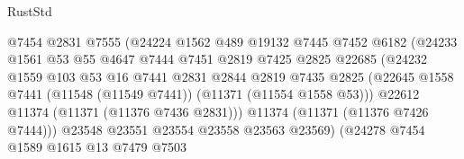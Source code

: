 \begin{lexlean}{RustStd}
\begin{coremodule}
                                    @7454
                                    @2831
                                    @7555
                                    (@24224
                                      @1562
                                      @489
                                      @19132
                                      @7445
                                      @7452
                                      @6182
                                      (@24233
                                        @1561
                                        @53
                                        @55
                                        @4647
                                        @7444
                                        @7451
                                        @2819
                                        @7425
                                        @2825
                                        @22685
                                        (@24232
                                          @1559
                                          @103
                                          @53
                                          @16
                                          @7441
                                          @2831
                                          @2844
                                          @2819
                                          @7435
                                          @2825
                                          (@22645
                                            @1558
                                            @7441
                                            (@11548 (@11549 @7441))
                                            (@11371 (@11554 @1558 @53)))
                                          @22612
                                          @11374
                                          (@11371 (@11376 @7436 @2831)))
                                        @11374
                                        (@11371 (@11376 @7426 @7444)))
                                      @23548
                                      @23551
                                      @23554
                                      @23558
                                      @23563
                                      @23569)
                                    (@24278
                                      @7454
                                      @1589
                                      @1615
                                      @13
                                      @7479
                                      @7503

\end{coremodule}
\end{lexlean}
